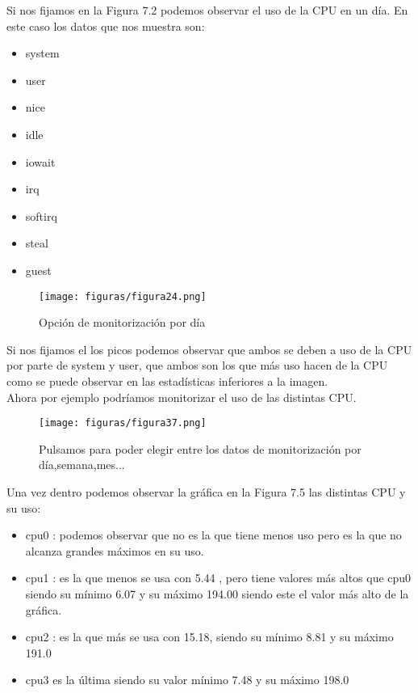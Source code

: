 Si nos fijamos en la Figura 7.2 podemos observar el uso de la CPU en un día. En este caso los datos que nos muestra son:
\begin{itemize}
	\item \textcolor{verde}{system}
	\item \textcolor{azuloscuro}{user}
	\item \textcolor{naranja}{nice}
	\item \textcolor{amarillo}{idle}
	\item \textcolor{morado}{iowait}
	\item \textcolor{violeta}{irq}
	\item \textcolor{verdelima}{softirq}
	\item \textcolor{rojo}{steal}
	\item \textcolor{gris}{guest}
\end{itemize}
\begin{figure}[H] %
	\centering
	\texttt{[image: figuras/figura24.png]}  %
	\label{figura24}
	
	\caption{Opción de monitorización por día} 
\end{figure}

Si nos fijamos el los picos podemos observar que ambos se deben a uso de la CPU por parte de  \textcolor{verde}{system} y \textcolor{azuloscuro}{user}, que ambos son los que más uso hacen de la CPU como se puede observar en las estadísticas inferiores a la imagen.
\\
Ahora por ejemplo podríamos monitorizar el uso de las distintas CPU.

\begin{figure}[H] %
	\centering
	\texttt{[image: figuras/figura37.png]}  %
	\label{figura37}
	
	\caption{Pulsamos para poder elegir entre los datos de monitorización por día,semana,mes...} 
\end{figure}

Una vez dentro podemos observar la gráfica en la Figura 7.5  las distintas CPU y su uso:\\

\begin{itemize}
	\item \textcolor{verde}{cpu0} : podemos observar que no es la que tiene menos uso pero es la que no alcanza grandes máximos en su uso.
	\item \textcolor{azuloscuro}{cpu1} : es la que menos se usa con 5.44 , pero tiene valores más altos que \textcolor{verde}{cpu0} siendo su mínimo 6.07 y su máximo 194.00 siendo este el valor más alto de la gráfica.
	\item \textcolor{naranja}{cpu2} : es la que más se usa con 15.18, siendo su mínimo 8.81 y su máximo 191.0
	\item \textcolor{amarillo}{cpu3} es la última siendo su valor mínimo 7.48 y su máximo 198.0
\end{itemize}

